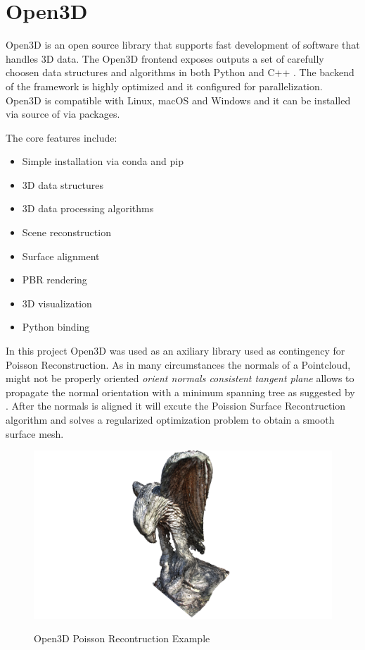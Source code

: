 \documentclass[12pt]{report}
\begin{document}
\section{Open3D}
\label{section:Open3D}
Open3D is an open source library that supports fast development of software that handles 3D data.
The Open3D frontend exposes outputs a set of carefully choosen data structures and algorithms in both Python and C++ . 
The backend of the framework is highly optimized and it configured for parallelization.
Open3D is compatible with Linux, macOS and Windows and it can be installed via source of via packages. 

The core features include: 
\begin{multicols}{2}
  \begin{itemize}
    \itemsep0em 
    \item Simple installation via conda and pip
    \item 3D data structures
    \item 3D data processing algorithms
    \item Scene reconstruction
    \item Surface alignment
    \item PBR rendering
    \item 3D visualization
    \item Python binding
  \end{itemize}
  \end{multicols}


In this project Open3D was used as an axiliary library used as contingency for Poisson Reconstruction. 
As in many circumstances the normals of a Pointcloud, might not be properly oriented \textit{orient normals consistent tangent plane} allows to propagate the normal orientation with a minimum
spanning tree as suggested by . 
After the normals is aligned it will  excute the Poission Surface Recontruction algorithm  and solves a regularized optimization problem to obtain a smooth surface mesh. 


\begin{figure}[H]%
  \centering
  \includegraphics[width=1\textwidth]{open3dpoisson.png}
 \caption{Open3D Poisson Recontruction Example}\cite[]{Zhou2018}
 \label{fig:Possion_exampple} 
\end{figure}
\end{document}
